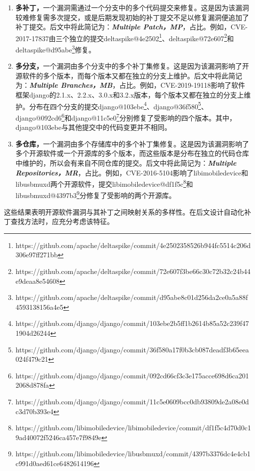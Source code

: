\begin{enumerate}
\item [（1）] \textbf{多补丁，}一个漏洞需通过一个分支中的多个代码提交来修复。这是因为该漏洞较难修复需多次提交，或是后期发现初始的补丁提交不足以修复漏洞便追加了补丁提交。后文中将此简记为：\textbf{\textit{Multiple Patch，MP}}，占比。例如，CVE-2017-17837由三个独立的提交deltaspike@4e2502\footnote{https://github.com/apache/deltaspike/commit/4e2502358526b944fc5514c206d306e97ff271bb}、deltaspike@72e607\footnote{https://github.com/apache/deltaspike/commit/72e607f3be66c30c72b32c24b44e9deaa8e54608}和\\deltaspike@d95abe\footnote{https://github.com/apache/deltaspike/commit/d95abe8c01d256da2ce0a5a88f4593138156a4e5}修复。
\item [（2）] \textbf{多分支，}一个漏洞由多个分支中的多个补丁集修复。这是因为该漏洞影响了开源软件的多个版本，而每个版本又都在独立的分支上维护。后文中将此简记为：\textbf{\textit{Multiple Branches，MB}}，占比。例如，CVE-2019-19118影响了软件框架django的2.1.x、2.2.x、3.0.x和3.2.x版本，每个版本又都在独立的分支上维护。分布在四个分支的提交django@103ebe\footnote{https://github.com/django/django/commit/103ebe2b5ff1b2614b85a52c239f471904d26244}、django@36f580\footnote{https://github.com/django/django/commit/36f580a17f0b3cb087deadf3b65eea024f479c21}、django@092cd6\footnote{https://github.com/django/django/commit/092cd66cf3c3e175acce698d6ca2012068d878fa}和django@11c5e0\footnote{https://github.com/django/django/commit/11c5e0609bcc0db93809de2a08e0dc3d70b393e4}分别修复了受影响的四个版本。其中，django@103ebe与其他提交中的代码变更并不相同。
\item [（3）] \textbf{多仓库，}一个漏洞由多个存储库中的多个补丁集修复。这是因为该漏洞影响了多个开源软件或一个开源库的多个版本，而这些版本是分布在独立的代码仓库中维护的，所以会有来自不同仓库的提交。后文中将此简记为：\textbf{\textit{Multiple Repositories，MR}}，占比。例如，CVE-2016-5104影响了libimobiledevice和libusbmuxd两个开源软件，提交libimobiledevice@df1f5c\footnote{https://github.com/libimobiledevice/libimobiledevice/commit/df1f5c4d70d0c19ad40072f5246ca457e7f9849e}和libusbmuxd@4397b3\footnote{https://github.com/libimobiledevice/libusbmuxd/commit/4397b3376dc4e4cb1c991d0aed61ce6482614196}分修复了受影响的两个开源库。

\end{enumerate}

这些结果表明开源软件漏洞与其补丁之间映射关系的多样性。在后文设计自动化补丁查找方法时，应充分考虑该特征。

